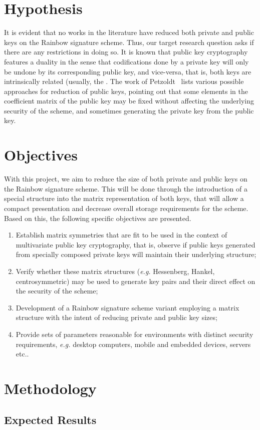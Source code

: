 \documentclass[10pt]{article}
\begin{document}
\section{Hypothesis}

It is evident that no works in the literature have reduced both private and public keys on the Rainbow signature scheme. Thus, our target research question asks if there are any restrictions in doing so. It is known that public key cryptography features a duality in the sense that codifications done by a private key will only be undone by its corresponding public key, and vice-versa, that is, both keys are intrinsically related (usually, the . The work of Petzoldt~\cite{Petzoldt:phd:2013:jul} lists various possible approaches for reduction of public keys, pointing out that some elements in the coefficient matrix of the public key may be fixed without affecting the underlying security of the scheme, and sometimes generating the private key from the public key. 

\section{Objectives}

With this project, we aim to reduce the size of both private and public keys on the Rainbow signature scheme. This will be done through the introduction of a special structure into the matrix representation of both keys, that will allow a compact presentation and decrease overall storage requirements for the scheme. Based on this, the following specific objectives are presented.

\begin{enumerate}[label=(\alph*)]
    \item Establish matrix symmetries that are fit to be used in the context of multivariate public key cryptography, that is, observe if public keys generated from specially composed private keys will maintain their underlying structure;
    \item Verify whether these matrix structures (\emph{e.g.} Hessenberg, Hankel, centrosymmetric) may be used to generate key pairs and their direct effect on the security of the scheme;
    \item Development of a Rainbow signature scheme variant employing a matrix structure with the intent of reducing private and public key sizes;
    \item Provide sets of parameters reasonable for environments with distinct security requirements, \emph{e.g.} desktop computers, mobile and embedded devices, servers etc..
\end{enumerate}


\section{Methodology}

\subsection{Expected Results}



\end{document}
